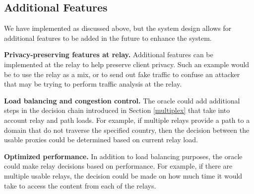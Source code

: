 \subsection{Additional Features}
We have implemented \system{} as discussed above, but the system design allows for 
additional features to be added in the future to enhance the system.

{\bf Privacy-preserving features at relay.}  Additional features can be 
implemented at the relay to help preserve client privacy.  Such an example would 
be to use the relay as a mix, or to send out fake traffic to confuse an 
attacker that may be trying to perform traffic analysis at the relay.

{\bf Load balancing and congestion control.} The oracle could add additional 
steps in the decision chain introduced in Section \ref{multiplex} that take 
into account relay and path loads.  For example, if multiple relays provide 
a path to a domain that do not traverse the specified country, then the 
decision between the usable proxies could be determined based on current relay 
load.

{\bf Optimized performance.} In addition to load balancing purposes, the oracle 
could make relay decisions based on performance.  For example, if there are 
multiple usable relays, the decision could be made on how much time it would 
take to access the content from each of the relays.
